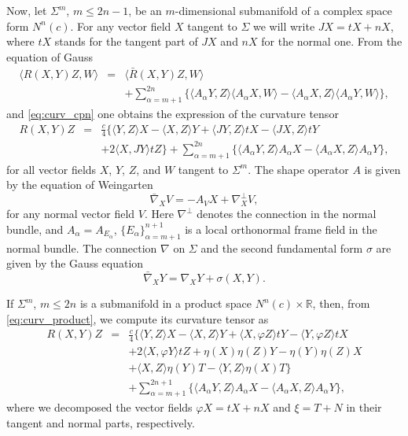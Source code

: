 \documentclass[11pt]{amsart}
\theoremstyle{plain}
\theoremstyle{definition}
\numberwithin{equation}{section}
\begin{document}
Now, let $\Sigma^m$, $m\leq 2n-1$, be an $m$-dimensional submanifold of a complex space form $N^n(c)$. For any vector field $X$ tangent to $\Sigma$ we will write $JX=tX+nX$, where $tX$ stands for the tangent part of $JX$ and $nX$ for the normal one. From the equation of Gauss
\begin{eqnarray*}
\langle R(X,Y)Z,W\rangle&=&\langle\bar R(X,Y)Z,W\rangle\\ &&+\sum_{\alpha=m+1}^{2n}\{\langle A_{\alpha}Y,Z\rangle\langle A_{\alpha}X,W\rangle-\langle A_{\alpha}X,Z\rangle\langle A_{\alpha}Y,W\rangle\},
\end{eqnarray*}
and \eqref{eq:curv_cpn} one obtains the expression of the curvature tensor
\begin{eqnarray}\label{eq:R_cpn}
R(X,Y)Z&=&\frac{c}{4}\{\langle Y,Z\rangle X-\langle X,Z\rangle Y+\langle JY,Z\rangle tX-\langle JX,Z\rangle tY\\\nonumber &&+2\langle
X,JY\rangle tZ\}+\sum_{\alpha=m+1}^{2n}\{\langle A_{\alpha}Y,Z\rangle A_{\alpha}X-\langle A_{\alpha}X,Z\rangle A_{\alpha}Y\},
\end{eqnarray}
for all vector fields $X$, $Y$, $Z$, and $W$ tangent to $\Sigma^m$. The shape operator $A$ is given by the equation of Weingarten
$$
\bar\nabla_XV=-A_VX+\nabla^{\perp}_XV,
$$
for any normal vector field $V$. Here $\nabla^{\perp}$ denotes the connection in the normal bundle, and
$A_{\alpha}=A_{E_{\alpha}}$, $\{E_{\alpha}\}_{\alpha=m+1}^{n+1}$
is a local orthonormal frame field in the normal bundle. The connection $\nabla$ on $\Sigma$ and the second fundamental form $\sigma$ are given by the Gauss equation
$$
\bar\nabla_XY=\nabla_XY+\sigma(X,Y).
$$

If $\Sigma^m$, $m\leq 2n$ is a submanifold in a product space $N^n(c)\times\mathbb{R}$, then, from \eqref{eq:curv_product}, we compute its curvature tensor as
\begin{eqnarray}\label{eq:R_product}
R(X,Y)Z&=&\frac{c}{4}\{\langle Y,Z\rangle X-\langle X,Z\rangle Y+\langle X,\varphi Z\rangle tY-\langle Y,\varphi Z\rangle tX\\
\nonumber &&+2\langle X,\varphi Y\rangle tZ+\eta(X)\eta(Z)Y-\eta(Y)\eta(Z)X\\\nonumber &&+\langle X,Z\rangle\eta(Y)T-\langle Y,Z\rangle\eta(X)T\}\\\nonumber &&+\sum_{\alpha=m+1}^{2n+1}\{\langle A_{\alpha}Y,Z\rangle A_{\alpha}X-\langle A_{\alpha}X,Z\rangle A_{\alpha}Y\},
\end{eqnarray}
where we decomposed the vector fields $\varphi X=tX+nX$ and $\xi=T+N$ in their tangent and normal parts, respectively.
\end{document}
